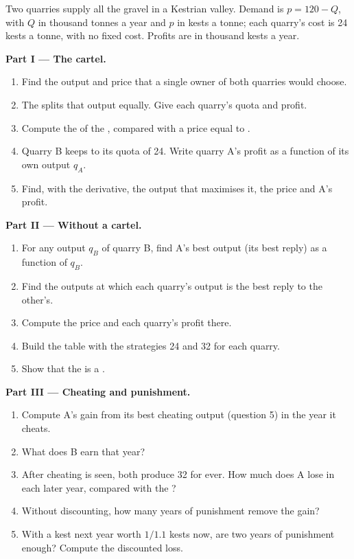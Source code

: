\begin{problem}
\label{pb:g11:oligopoly-and-games:1}
Two quarries supply all the gravel in a Kestrian valley. Demand is $p = 120 - Q$, with $Q$ in thousand tonnes a year and $p$ in kests a tonne; each quarry's cost is 24
kests a tonne, with no fixed cost. Profits are in thousand kests a year.

\medskip
\noindent\textbf{Part I --- The cartel.}
\begin{enumerate}
\item Find the output and price that a single owner of both quarries would choose.
\item The  splits that output equally. Give each quarry's quota and profit.
\item Compute the  of the , compared with a price equal to .
\item Quarry B keeps to its quota of 24. Write quarry A's profit as a function of its own output $q_A$.
\item Find, with the derivative, the output that maximises it, the price and A's profit.
\end{enumerate}

\medskip
\noindent\textbf{Part II --- Without a cartel.}
\begin{enumerate}[resume]
\item For any output $q_B$ of quarry B, find A's best output (its best reply) as a function of $q_B$.
\item Find the outputs at which each quarry's output is the best reply to the other's.
\item Compute the price and each quarry's profit there.
\item Build the  table with the strategies 24 and 32 for each quarry.
\item Show that the  is a .
\end{enumerate}

\medskip
\noindent\textbf{Part III --- Cheating and punishment.}
\begin{enumerate}[resume]
\item Compute A's gain from its best cheating output (question 5) in the year it cheats.
\item What does B earn that year?
\item After cheating is seen, both produce 32 for ever. How much does A lose in each later year, compared with the ?
\item Without discounting, how many years of punishment remove the gain?
\item With a kest next year worth $1/1.1$ kests now, are two years of punishment enough? Compute the discounted loss.
\end{enumerate}


\end{problem}
